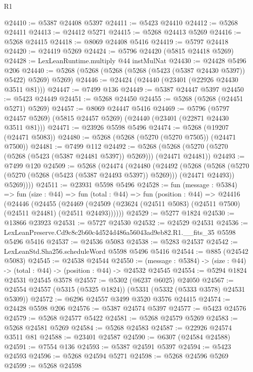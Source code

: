 \begin{lexlean}{R1}
\begin{coremodule}
@24410 := @5387 @24408 @5397
@24411 := @5423 @24410
@24412 := @5268 @24411
@24413 := @24412 @5271
@24415 := @5268 @24413 @5269
@24416 := @5268 @24415
@24418 := @8069 @24408 @5416
@24419 := @5797 @24418
@24420 := @24419 @5269
@24424 := @5796 @24420 (@5815 @24418 @5269)
@24428 := LexLeanRuntime.multiply @44 instMulNat
@24430 := @24428 @5496 @206
@24440 := @5268 (@5268 (@5268 (@5268 (@5423 (@5387 @24430 @5397)) @5422) @5269) @5269)
@24446 := @24424 (@24440 (@23401 (@22926 @24430 @3511 @81)))
@24447 := @7499 @136
@24449 := @5387 @24447 @5397
@24450 := @5423 @24449
@24451 := @5268 @24450
@24455 := @5268 (@5268 (@24451 @5271) @5269)
@24457 := @8069 @24447 @5416
@24469 := @5796
    (@5797 @24457 @5269)
    (@5815 @24457 @5269)
    (@24440 (@23401 (@22871 @24430 @3511 @81)))
@24471 := @23926 @5598 @5496
@24474 := @5268 (@19207 (@24471 @5083))
@24480 := @5268 (@5268 (@5270 (@5270 @7505)) (@24471 @7500))
@24481 := @7499 @112
@24492 := @5268 (@5268 (@5270 (@5270 (@5268 (@5423 (@5387 @24481 @5397)) @5269))) (@24471 @24481))
@24493 := @7499 @120
@24509 := @5268
    (@24474
      (@24480
        (@24492
          (@5268
            (@5268 (@5270 (@5270 (@5268 (@5423 (@5387 @24493 @5397)) @5269))) (@24471 @24493))
            @5269))))
@24511 := @23931 @5598 @5496
@24528 := fun (message : @5384) =>
  fun (size : @44) =>
  fun (total : @44) =>
  fun (position : @44) =>
  @24416
    (@24446
      (@24455
        (@24469 (@24509 (@23624 (@24511 @5083) (@24511 @7500) (@24511 @24481) (@24511 @24493))))))
@24529 := @5277 @1824
@24530 := @13866 @23923
@24531 := @5727 @24530
@24532 := @24529 @24531
@24536 := LexLeanPreserve.Cd9c8c2b60c4d524d486a56043ad9eb82.R1.__fits_35 @5598 @5496 @5416
@24537 := @24536 @5083
@24538 := @5283 @24537
@24542 := LexLeanStd.Sha256.scheduleWord @5598 @5496 @5416
@24544 := @885 (@24542 @5083)
@24545 := @24538 @24544
@24550 := (message : @5384) -> (size : @44) -> (total : @44) -> (position : @44) -> @24532 @24545
@24554 := @5294 @1824 @24531 @24545 @3578
@24557 := @5302 (@6237 @6025) @24050
@24567 := @24554 @24557 (@5315 (@5325 @1824)) (@5331 (@5332 (@5333 @3578) @24531 @5309))
@24572 := @6296 @24557 @3499 @3520 @3576 @24415
@24574 := @24428 @5598 @206
@24576 := @5387 @24574 @5397
@24577 := @5423 @24576
@24579 := @5268 @24577 @5422
@24581 := @5268 @24579 @5269
@24583 := @5268 @24581 @5269
@24584 := @5268 @24583
@24587 := @22926 @24574 @3511 @81
@24588 := @23401 @24587
@24590 := @6307 (@24584 @24588)
@24591 := @7554 @136
@24593 := @5387 @24591 @5397
@24594 := @5423 @24593
@24596 := @5268 @24594 @5271
@24598 := @5268 @24596 @5269
@24599 := @5268 @24598

\end{coremodule}
\end{lexlean}
